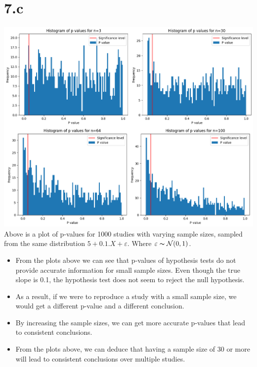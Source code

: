\documentclass[12pt]{article}
\begin{document}
\section*{7.c}
\includegraphics*[width=\linewidth]{graph7c}
Above is a plot of p-values for 1000 studies with varying sample sizes, sampled
from the same distribution \(5 + 0.1 . X + \varepsilon\). Where \(\varepsilon \thicksim \mathcal{N}(0, 1)\).
\begin{itemize}
    \item From the plots above we can see that p-values of hypothesis tests
    do not provide accurate information for small sample sizes. Even though the
    true slope is 0.1, the hypothesis test does not seem to reject the null
    hypothesis.
    \item As a result, if we were to reproduce a study with a small sample size,
    we would get a different p-value and a different conclusion.
    \item By increasing the sample sizes, we can get more accurate p-values
    that lead to consistent conclusions.
    \item From the plots above, we can deduce that having a sample size of 30
    or more will lead to consistent conclusions over multiple studies.
\end{itemize}

\newpage
\end{document}
